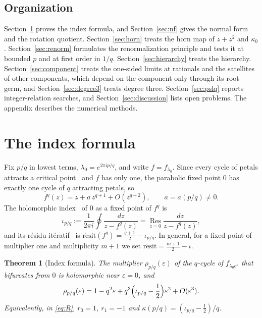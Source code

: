 \documentclass[11pt]{amsart}
\newtheorem{theorem}{Theorem}[section]
\theoremstyle{definition}
\theoremstyle{remark}
\newcommand{\Res}{\operatorname*{Res}}
\newcommand{\resit}{\operatorname{r\acute{e}sit}}
\begin{document}
\subsection{Organization}
Section~\ref{sec:index} proves the index formula, and Section~\ref{sec:nf} gives the normal form and the rotation quotient. Section~\ref{sec:horn} treats the horn map of $z+z^2$ and $\kappa_0$. Section~\ref{sec:renorm} formulates the renormalization principle and tests it at bounded $p$ and at first order in $1/q$. Section~\ref{sec:hierarchy} treats the hierarchy. Section~\ref{sec:component} treats the one-sided limits at rationals and the satellites of other components, which depend on the component only through its root germ, and Section~\ref{sec:degree3} treats degree three. Section~\ref{sec:pslq} reports integer-relation searches, and Section~\ref{sec:discussion} lists open problems. The appendix describes the numerical methods.

\section{The index formula}\label{sec:index}

Fix $p/q$ in lowest terms, $\lambda_0=e^{2\pi ip/q}$, and write $f=f_{\lambda_0}$. Since every cycle of petals attracts a critical point~\cite[\S10]{Milnor} and $f$ has only one, the parabolic fixed point $0$ has exactly one cycle of $q$ attracting petals, so
\begin{equation}\label{eq:fq}
f^q(z)=z+a\,z^{q+1}+O(z^{q+2}),\qquad a=a(p/q)\neq0 .
\end{equation}
The holomorphic index~\cite[\S12]{Milnor} of $0$ as a fixed point of $f^q$ is
\[
\iota_{p/q}:=\frac1{2\pi i}\oint\frac{dz}{z-f^q(z)}=\Res_{z=0}\frac{dz}{z-f^q(z)},
\]
and its r\'esidu it\'eratif~\cite{Ecalle,BE} is $\resit(f^q)=\frac{q+1}{2}-\iota_{p/q}$. In general, for a fixed point of multiplier one and multiplicity $m+1$ we set $\resit=\frac{m+1}2-\iota$.

\begin{theorem}[Index formula]\label{thm:index}
The multiplier $\rho_{p/q}(\varepsilon)$ of the $q$-cycle of $f_{\lambda_0e^\varepsilon}$ that bifurcates from $0$ is holomorphic near $\varepsilon=0$, and
\[
\rho_{p/q}(\varepsilon)=1-q^2\varepsilon+q^3\Bigl(\iota_{p/q}-\frac12\Bigr)\varepsilon^2+O(\varepsilon^3).
\]
Equivalently, in \eqref{eq:R}, $r_0=1$, $r_1=-1$ and $\kappa(p/q)=(\iota_{p/q}-\frac12)/q$.
\end{theorem}
\end{document}
